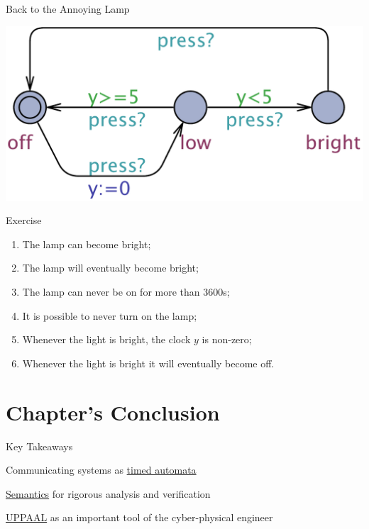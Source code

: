\documentclass{beamer}
\begin{document}
\begin{frame}{Back to the Annoying Lamp}

        \centering
        \includegraphics[scale=0.25]{./images/Lamp.pdf}

        \begin{block}{Exercise}
	\begin{enumerate}
                \item The lamp can become bright;
                \item The lamp will eventually become bright;
                \item The lamp can never be on for more than 3600s;
                \item It is possible to never turn on the lamp;
                \item Whenever the light is bright, the clock $y$
                        is non-zero;
                \item Whenever the light is bright it will eventually
                        become off.
	\end{enumerate}
        \end{block}
\end{frame}

\section{Chapter's Conclusion}

\begin{frame}{Key Takeaways}

        Communicating systems as  \alert{\underline{timed automata}} 


        \vspace{0.5cm}
        \alert{\underline{Semantics}} for rigorous analysis and verification

        \vspace{1cm}
        \alert{\underline{UPPAAL}} as an important tool of the cyber-physical engineer
\end{frame}
\end{document}
